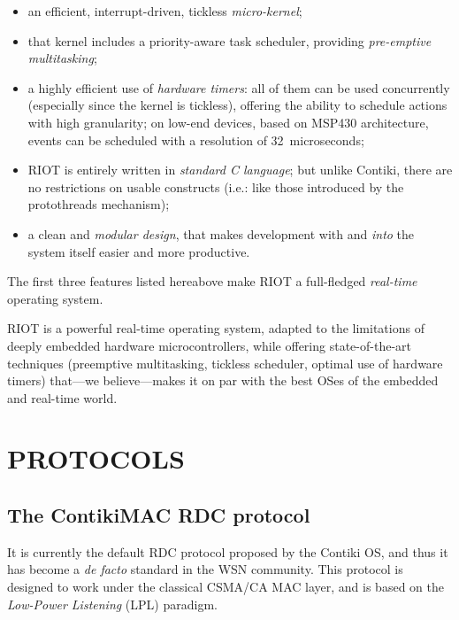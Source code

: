\documentclass[a4paper,twoside]{article}
\begin{document}
\begin{itemize}

\item an efficient, interrupt-driven, tickless \emph{micro-kernel};

\item that kernel includes a priority-aware task scheduler, providing
      \emph{pre-emptive multitasking};

\item a highly efficient use of \emph{hardware timers}: all of them can be
      used concurrently (especially since the kernel is tickless), offering
      the ability to schedule actions with high granularity; on low-end
      devices, based on MSP430 architecture, events can be scheduled
      with a resolution of 32~microseconds;

\item RIOT is entirely written in \emph{standard C language}; but unlike
      Contiki, there are no restrictions on usable constructs (i.e.: like
      those introduced by the protothreads mechanism);

\item a clean and \emph{modular design}, that makes development with and
      \emph{into} the system itself easier and more productive.

\end{itemize}

The first three features listed hereabove make RIOT a full-fledged
\emph{real-time} operating system.

RIOT is a powerful real-time operating system, adapted to the limitations
of deeply embedded hardware microcontrollers, while offering state-of-the-art
techniques (preemptive multitasking, tickless scheduler, optimal use
of hardware timers) that---we believe---makes it on par with
the best OSes of the embedded and real-time world.



\section{\uppercase{Protocols}}
\label{SectProtoDescription}

\subsection{The ContikiMAC RDC protocol}

It is currently the default RDC protocol proposed by the Contiki OS, and
thus it has become a \textit{de facto} standard in the WSN community.
This protocol is designed to work under the classical CSMA/CA MAC layer,
and is based on the \emph{Low-Power Listening} (LPL) paradigm.
\end{document}
